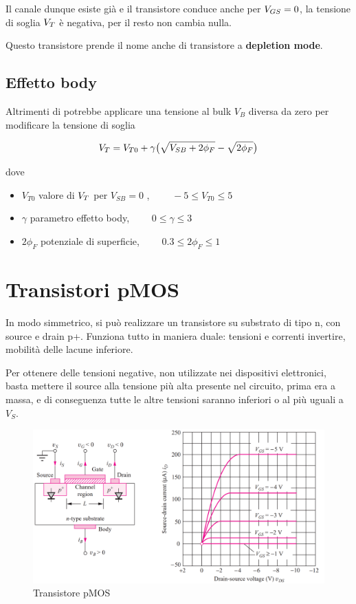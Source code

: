 Il canale dunque esiste già e il transistore	conduce	anche	per $V_{GS} = 0$, la tensione di soglia $V_{T}$ è  negativa, per il resto non cambia nulla.

Questo transistore prende il nome anche di transistore a \textbf{depletion mode}.


\subsection{Effetto body}

Altrimenti di potrebbe applicare una tensione al bulk $V_B$ diversa da zero per modificare la tensione di soglia

\begin{equation}
    V_{T} = V_{T0} + \gamma\big(\sqrt{V_{SB} + 2\phi_F} - \sqrt{2\phi_F}\big)
    \label{Equazione_effetto_body}
\end{equation}

dove
\begin{itemize}
    \item $V_{T0} $ valore di $V_{T}$ per $V_{SB} = 0$ , $\qquad -5\leq V_{T0} \leq 5$
    \item $\gamma $ parametro effetto body, $\qquad 0\leq \gamma \leq 3$
    \item $2\phi_F$ potenziale di superficie, $ \qquad 0.3 \leq 2\phi_F \leq 1$
\end{itemize}

\newpage
\section{Transistori pMOS}
In	modo	simmetrico,	si	può	realizzare	un	transistore	su	substrato	di	tipo	n,	con	source	e	drain	p+. Funziona tutto in maniera duale: tensioni e correnti invertire, mobilità delle lacune inferiore.

Per ottenere delle tensioni negative, non utilizzate nei dispositivi elettronici, basta mettere il source alla tensione più alta presente nel circuito, prima era a massa, e di conseguenza tutte le altre tensioni saranno inferiori o al più uguali a $V_S$.


\begin{figure}[htbp]
    \centering
    \includegraphics[width=0.8\linewidth]{img/pMOS.png}
    \caption{Transistore pMOS}    
\end{figure}

